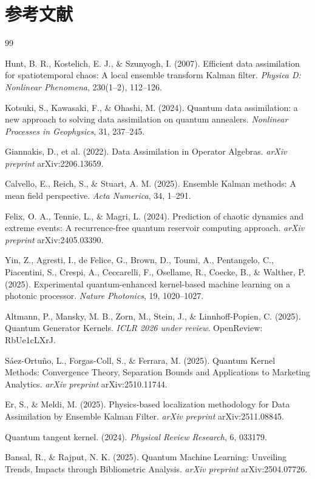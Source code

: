 \section*{参考文献}
\begin{thebibliography}{99}

Hunt, B. R., Kostelich, E. J., \& Szunyogh, I. (2007).
Efficient data assimilation for spatiotemporal chaos: A local ensemble transform Kalman filter.
\textit{Physica D: Nonlinear Phenomena}, 230(1--2), 112--126.

Kotsuki, S., Kawasaki, F., \& Ohashi, M. (2024).
Quantum data assimilation: a new approach to solving data assimilation on quantum annealers.
\textit{Nonlinear Processes in Geophysics}, 31, 237--245.

Giannakis, D., et al. (2022).
Data Assimilation in Operator Algebras.
\textit{arXiv preprint} arXiv:2206.13659.

Calvello, E., Reich, S., \& Stuart, A. M. (2025).
Ensemble Kalman methods: A mean field perspective.
\textit{Acta Numerica}, 34, 1--291.

Felix, O. A., Tennie, L., \& Magri, L. (2024).
Prediction of chaotic dynamics and extreme events: A recurrence-free quantum reservoir computing approach.
\textit{arXiv preprint} arXiv:2405.03390.

Yin, Z., Agresti, I., de Felice, G., Brown, D., Toumi, A., Pentangelo, C., Piacentini, S., Crespi, A., Ceccarelli, F., Osellame, R., Coecke, B., \& Walther, P. (2025).
Experimental quantum-enhanced kernel-based machine learning on a photonic processor.
\textit{Nature Photonics}, 19, 1020--1027.

Altmann, P., Mansky, M. B., Zorn, M., Stein, J., \& Linnhoff-Popien, C. (2025).
Quantum Generator Kernels.
\textit{ICLR 2026 under review}. OpenReview: RbUe1cLXrJ.

S\'aez-Ortu\~no, L., Forgas-Coll, S., \& Ferrara, M. (2025).
Quantum Kernel Methods: Convergence Theory, Separation Bounds and Applications to Marketing Analytics.
\textit{arXiv preprint} arXiv:2510.11744.

Er, S., \& Meldi, M. (2025).
Physics-based localization methodology for Data Assimilation by Ensemble Kalman Filter.
\textit{arXiv preprint} arXiv:2511.08845.

Quantum tangent kernel. (2024).
\textit{Physical Review Research}, 6, 033179.

Bansal, R., \& Rajput, N. K. (2025).
Quantum Machine Learning: Unveiling Trends, Impacts through Bibliometric Analysis.
\textit{arXiv preprint} arXiv:2504.07726.

\end{thebibliography}
